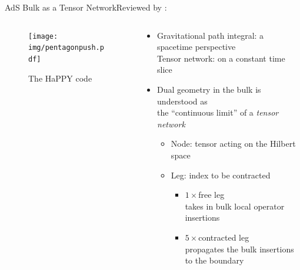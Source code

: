 \documentclass[aspectratio=169,10pt
	,noamsthm
]{beamer}
\begin{document}
\begin{frame}{AdS Bulk as a Tensor Network}{Reviewed by \textcite{Harlow:2018fse}:\,}
	\begin{columns}
	\begin{column}{.35\textwidth}
		\begin{figure}[!h]
		\centering
		\texttt{[image: img/pentagonpush.pdf]}
		\caption{The HaPPY code \cite{Pastawski:2015qua,Harlow:2018fse}}
		\end{figure}
	\end{column}
	\begin{column}{.65\textwidth}
		\begin{itemize}
		\item Gravitational path integral: a spacetime perspective\\
		Tensor network: on a constant time slice
	\pause
		\item Dual geometry in the bulk is understood as\\ the ``continuous limit'' of a \textit{tensor network}\\
			\begin{itemize}
			\item Node: tensor acting on the Hilbert space
			\item Leg: index to be contracted
				\begin{itemize}
				\item $1\times{}$free leg \\takes in bulk local operator insertions
				\item $5\times{}$contracted leg \\propagates the bulk insertions to the boundary
				\end{itemize}
			\end{itemize}
		\end{itemize}
	\end{column}
	\end{columns}
\end{frame}
\end{document}
